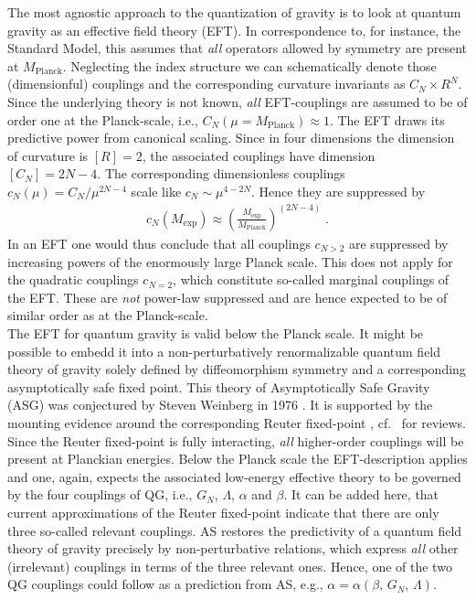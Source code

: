 \documentclass[a4paper,oneside,openany,11pt]{memoir}
\numberwithin{equation}{section} %
\begin{document}
The most agnostic approach to the quantization of gravity is to look at quantum gravity as an effective field theory (EFT). In correspondence to, for instance, the Standard Model, this assumes that \emph{all} operators allowed by symmetry are present at $M_\text{Planck}$. Neglecting the index structure we can schematically denote those (dimensionful) couplings and the corresponding curvature invariants as $C_N\times R^N$. Since the underlying theory is not known, \emph{all} EFT-couplings are assumed to be of order one at the Planck-scale, i.e., $C_N(\mu=M_\text{Planck})\approx 1$. The EFT draws its predictive power from canonical scaling. Since in four dimensions the dimension of curvature is $[R]=2$, the associated couplings have dimension $[C_N] = 2N - 4$. The corresponding dimensionless couplings $c_N(\mu) = C_N / \mu^{2N-4}$ scale like $c_N \sim \mu^{4-2N}$. Hence they are suppressed by
\begin{align}
    c_N(M_\text{exp}) \approx \left(\frac{M_\text{exp}}{M_\text{Planck}}\right)^{(2N-4)}\;.
\end{align}
    In an EFT one would thus conclude that all couplings $c_{N>2}$ are suppressed by increasing powers of the enormously large Planck scale. This does not apply for the quadratic couplings $c_{N=2}$, which constitute so-called marginal couplings of the EFT. These are \emph{not} power-law suppressed and are hence expected to be of similar order as at the Planck-scale.
\\
    
The EFT for quantum gravity is valid below the Planck scale. It might be possible to embedd it into a non-perturbatively renormalizable quantum field theory of gravity solely defined by diffeomorphism symmetry and a corresponding asymptotically safe fixed point. This theory of Asymptotically Safe Gravity (ASG) was conjectured by Steven Weinberg in 1976 \cite{Weinberg:1980gg}.  It is supported by the mounting evidence around the corresponding Reuter fixed-point \cite{Reuter:1996cp}, cf.~\cite{} for reviews. Since the Reuter fixed-point is fully interacting, \emph{all} higher-order couplings will be present at Planckian energies. Below the Planck scale the EFT-description applies and one, again, expects the associated low-energy effective theory to be governed by the four couplings of QG, i.e., $G_N$, $\Lambda$, $\alpha$ and $\beta$. It can be added here, that current approximations of the Reuter fixed-point indicate that there are only three so-called relevant couplings. AS restores the predictivity of a quantum field theory of gravity precisely by non-perturbative relations, which express \emph{all} other (irrelevant) couplings in terms of the three relevant ones. Hence, one of the two QG couplings could follow as a prediction from AS, e.g., $\alpha = \alpha (\beta,\,G_N,\,\Lambda)$.
\end{document}
